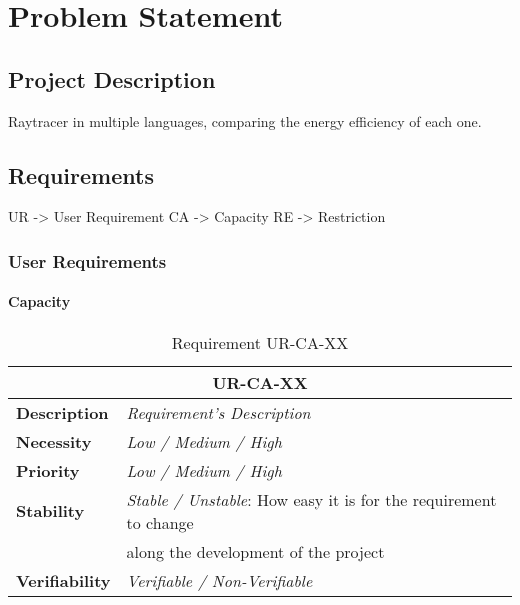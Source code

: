 \chapter{Problem Statement}\label{chap:analysis}

\section{Project Description}
Raytracer in multiple languages, comparing the energy efficiency of each one.

\section{Requirements}

UR -> User Requirement
CA -> Capacity
RE -> Restriction

\subsection{User Requirements}

\subsubsection{Capacity}

\begin{table}[H]
    \centering
    \begin{tabular}{l p{10cm}}
        \toprule
        \multicolumn{2}{c}{UR-CA-XX} \\
        \toprule
        \textbf{Description}        & \textit{Requirement's Description} \\
        \textbf{Necessity}          & \textit{Low / Medium / High} \\
        \textbf{Priority}           & \textit{Low / Medium / High} \\
        \multirow{1}{*}{\textbf{Stability}} & \textit{Stable / Unstable}: How easy it is for the requirement to change \\ 
                                            & along the development of the project \\
        \textbf{Verifiability}       & \textit{Verifiable / Non-Verifiable} \\
    \end{tabular}
    \caption{Requirement UR-CA-XX}
    \label{tab:ur-ca-xx}
\end{table}


